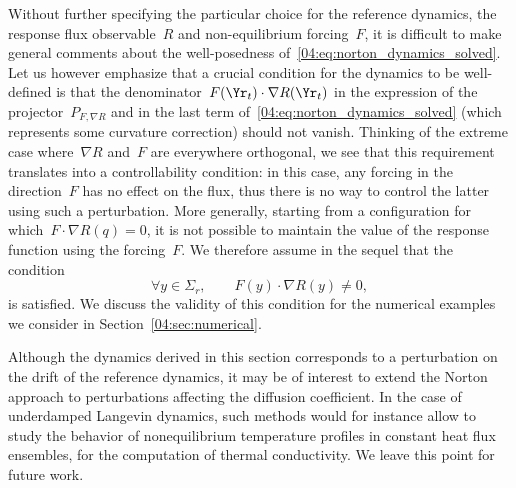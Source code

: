 Without further specifying the particular choice for the reference dynamics, the response flux observable~$R$ and non-equilibrium forcing~$F$, it is difficult to make general comments about the well-posedness of~\eqref{04:eq:norton_dynamics_solved}.
Let us however emphasize that a crucial condition for the dynamics to be well-defined is that the denominator~$F(\Yr_t) \cdot \nabla R(\Yr_t)$ in the expression of the projector~$P_{F,\nabla R}$ and in the last term of~\eqref{04:eq:norton_dynamics_solved} (which represents some curvature correction) should not vanish.
Thinking of the extreme case where~$\nabla R$ and~$F$ are everywhere orthogonal, we see that this requirement translates into a controllability condition: in this case, any forcing in the direction~$F$ has no effect on the flux, thus there is no way to control the latter using such a perturbation. More generally, starting from a configuration for which~$F\cdot \nabla R(q)=0$, it is not possible to maintain the value of the response function using the forcing~$F$. We therefore assume in the sequel that the condition
\begin{equation}
    \label{04:eq:norton_controllability_condition}
    \forall y\in\Sigma_r,\qquad F(y)\cdot \nabla R(y) \neq 0,
\end{equation}
is satisfied. We discuss the validity of this condition for the numerical examples we consider in Section~\ref{04:sec:numerical}.
\begin{remark}
    Although the dynamics derived in this section corresponds to a perturbation on the drift of the reference dynamics, it may be of interest to extend the Norton approach to perturbations affecting the diffusion coefficient. In the case of underdamped Langevin dynamics, such methods would for instance allow to study the behavior of nonequilibrium temperature profiles in constant heat flux ensembles, for the computation of thermal conductivity. We leave this point for future work. 
\end{remark}

